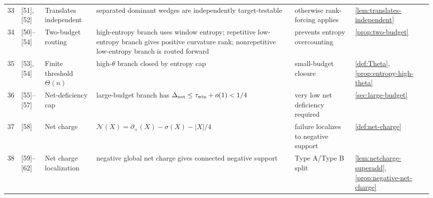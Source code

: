 \documentclass[11pt]{article}
\newcommand{\defp}{\partial_+}
\newcommand{\No}{\mathcal N}
\begin{document}
{\begin{longtable}{C{0.04\textwidth} L{0.13\textwidth} L{0.17\textwidth} L{0.25\textwidth} L{0.21\textwidth} L{0.12\textwidth}}
33 & [51], [52] & Translates independent & separated dominant wedges are independently target-testable & otherwise rank-forcing applies & \cref{lem:translates-independent} \\
34 & [50]--[54] & Two-budget routing & high-entropy branch uses window entropy; repetitive low-entropy branch gives positive curvature rank; nonrepetitive low-entropy branch is routed forward & prevents entropy overcounting & \cref{prop:two-budget} \\
35 & [53], [54] & Finite threshold $\Theta(n)$ & high-$\theta$ branch closed by entropy cap & small-budget closure & \cref{def:Theta}, \cref{prop:entropy-high-theta} \\
36 & [55]--[57] & Net-deficiency cap & large-budget branch has $\Delta_{\mathrm{net}}\le\tau_{\rm win}+o(1)<1/4$ & very low net deficiency required & \cref{sec:large-budget} \\
37 & [58] & Net charge & $\No(X)=\defp(X)-\sigma(X)-|X|/4$ & failure localizes to negative support & \cref{def:net-charge} \\
38 & [59]--[62] & Net charge localization & negative global net charge gives connected negative support & Type A/Type B split & \cref{lem:netcharge-superadd}, \cref{prop:negative-net-charge} \\

\end{longtable}}
\end{document}
